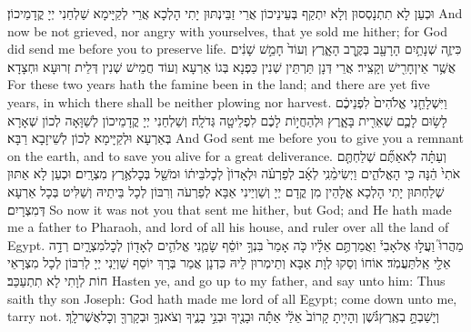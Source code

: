 {וּכְעַן לָא תִתְנָסְסוּן וְלָא יִתְקַף בְּעֵינֵיכוֹן אֲרֵי זַבֵּינְתּוּן יָתִי הָלְכָא אֲרֵי לְקַיָּימָא שַׁלְחַנִי יְיָ קֳדָמֵיכוֹן׃}
{And now be not grieved, nor angry with yourselves, that ye sold me hither; for God did send me before you to preserve life.}{}
{כִּי\maqqaf זֶ֛ה שְׁנָתַ֥יִם הָרָעָ֖ב בְּקֶ֣רֶב הָאָ֑רֶץ וְעוֹד֙ חָמֵ֣שׁ שָׁנִ֔ים אֲשֶׁ֥ר אֵין\maqqaf חָרִ֖ישׁ וְקָצִֽיר׃}
{אֲרֵי דְּנָן תַּרְתֵּין שְׁנִין כַּפְנָא בְּגוֹ אַרְעָא וְעוֹד חֲמֵישׁ שְׁנִין דְּלֵית זְרוּעָא וּחְצָדָא׃}
{For these two years hath the famine been in the land; and there are yet five years, in which there shall be neither plowing nor harvest.}{}
{וַיִּשְׁלָחֵ֤נִי אֱלֹהִים֙ לִפְנֵיכֶ֔ם לָשׂ֥וּם לָכֶ֛ם שְׁאֵרִ֖ית בָּאָ֑רֶץ וּלְהַחֲי֣וֹת לָכֶ֔ם לִפְלֵיטָ֖ה גְּדֹלָֽה׃}
{וְשַׁלְחַנִי יְיָ קֳדָמֵיכוֹן לְשַׁוָּאָה לְכוֹן שְׁאָרָא בְּאַרְעָא וּלְקַיָּימָא לְכוֹן לְשֵׁיזָבָא רַבָּא׃}
{And God sent me before you to give you a remnant on the earth, and to save you alive for a great deliverance.}{}
{וְעַתָּ֗ה לֹֽא\maqqaf אַתֶּ֞ם שְׁלַחְתֶּ֤ם אֹתִי֙ הֵ֔נָּה כִּ֖י הָאֱלֹהִ֑ים וַיְשִׂימֵ֨נִֽי לְאָ֜ב לְפַרְעֹ֗ה וּלְאָדוֹן֙ לְכׇל\maqqaf בֵּית֔וֹ וּמֹשֵׁ֖ל בְּכׇל\maqqaf אֶ֥רֶץ מִצְרָֽיִם׃}
{וּכְעַן לָא אַתּוּן שְׁלַחְתּוּן יָתִי הָלְכָא אֱלָהֵין מִן קֳדָם יְיָ וְשַׁוְיַינִי אַבָּא לְפַרְעֹה וְרִבּוֹן לְכָל בֵּיתֵיהּ וְשַׁלִּיט בְּכָל אַרְעָא דְּמִצְרָיִם׃}
{So now it was not you that sent me hither, but God; and He hath made me a father to Pharaoh, and lord of all his house, and ruler over all the land of Egypt.}{}
{מַהֲרוּ֮ וַעֲל֣וּ אֶל\maqqaf אָבִי֒ וַאֲמַרְתֶּ֣ם אֵלָ֗יו כֹּ֤ה אָמַר֙ בִּנְךָ֣ יוֹסֵ֔ף שָׂמַ֧נִי אֱלֹהִ֛ים לְאָד֖וֹן לְכׇל\maqqaf מִצְרָ֑יִם רְדָ֥ה אֵלַ֖י אַֽל\maqqaf תַּעֲמֹֽד׃}
{אוֹחוֹ וְסַקוּ לְוָת אַבָּא וְתֵימְרוּן לֵיהּ כִּדְנָן אֲמַר בְּרָךְ יוֹסֵף שַׁוְיַנִי יְיָ לְרִבּוֹן לְכָל מִצְרָאֵי חוֹת לְוָתִי לָא תִתְעַכַּב׃}
{Hasten ye, and go up to my father, and say unto him: Thus saith thy son Joseph: God hath made me lord of all Egypt; come down unto me, tarry not.}{}
{וְיָשַׁבְתָּ֣ בְאֶֽרֶץ\maqqaf גֹּ֗שֶׁן וְהָיִ֤יתָ קָרוֹב֙ אֵלַ֔י אַתָּ֕ה וּבָנֶ֖יךָ וּבְנֵ֣י בָנֶ֑יךָ וְצֹאנְךָ֥ וּבְקָרְךָ֖ וְכׇל\maqqaf אֲשֶׁר\maqqaf לָֽךְ׃}
